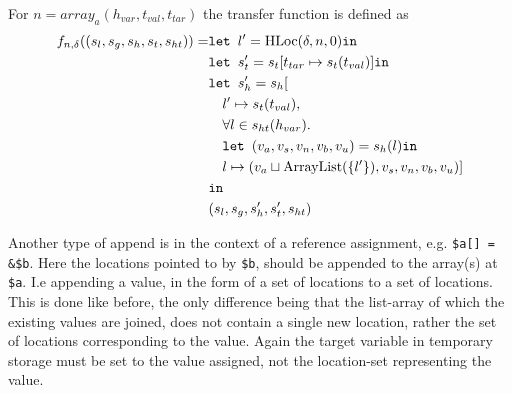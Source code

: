 For $n = \mathit{array}_a(h_{var}, t_{val},t_{tar})$ the transfer function is defined as
\begin{align}
    f_{n,\delta}((s_l, s_g, s_h, s_t, s_{ht})) = &\texttt{let } l' = \text{HLoc}(\delta, n, 0) \texttt{in } \notag\\
                              &\texttt{let } s_t' = s_t[t_{tar}\mapsto s_t(t_{val})] \texttt{in }\notag\\
                              &\texttt{let } s_h' = s_h[\notag\\
                              &\quad l' \mapsto s_t(t_{val}), \notag\\
                              &\quad \forall l \in s_{ht}(h_{var}).\notag\\
                              &\quad\texttt{let } (v_a,v_s,v_n,v_b,v_u) = s_h(l) \texttt{in } \notag\\
                              &\quad l\mapsto (v_a \sqcup \text{ArrayList}(\{l'\}), v_s, v_n, v_b, v_u)]\notag\\
                              & \texttt{in }\notag\\
                              &(s_l, s_g, s_h', s_t', s_{ht})
\end{align}

Another type of append is in the context of a reference assignment, e.g. \texttt{\$a[] = \&\$b}. Here the locations pointed to by \texttt{\$b}, should be appended to the array(s) at \texttt{\$a}. I.e appending a value, in the form of a set of locations to a set of locations. This is done like before, the only difference being that the list-array of which the existing values are joined, does not contain a single new location, rather the set of locations corresponding to the value. Again the target variable in temporary storage must be set to the value assigned, not the location-set representing the value.

